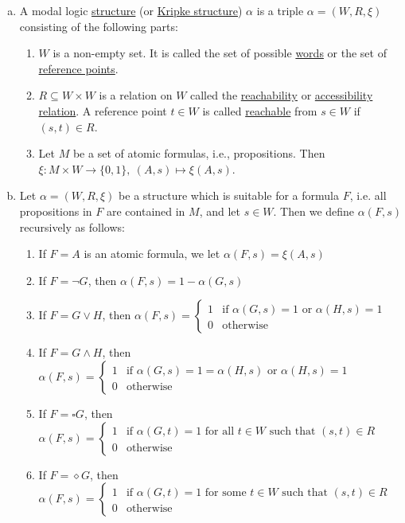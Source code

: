 \documentclass[a4paper]{article}
\newcommand{\ul}{\underline}
\begin{document}
\begin{enumerate}[(a)]
	\item A modal logic \ul{structure} (or \ul{Kripke structure}) $\alpha$ is a triple $\alpha=(W,R,\xi)$ consisting of the following parts:
	\begin{enumerate}[(1)]
		\item $W$ is a non-empty set. It is called the set of possible \ul{words} or the set of \ul{reference points}.
		\item $R\subseteq W\times W$ is a relation on $W$ called the \ul{reachability} or \ul{accessibility relation}. A reference point $t\in W$ is called \ul{reachable} from $s\in W$ if $(s,t)\in R$.
		\item Let $M$ be a set of atomic formulas, i.e., propositions. Then $\xi:M\times W\rightarrow\{0,1\},\ (A,s)\mapsto\xi(A,s)$.
	\end{enumerate}
	\item Let $\alpha=(W,R,\xi)$ be a structure which is suitable for a formula $F$, i.e. all propositions in $F$ are contained in $M$, and let $s\in W$. Then we define $\alpha(F,s)$ recursively as follows:
	\begin{enumerate}[(1)]
		\item If $F=A$ is an atomic formula, we let $\alpha(F,s)=\xi(A,s)$
		\item If $F=\neg G$, then $\alpha(F,s)=1-\alpha(G,s)$
		\item If $F=G\vee H$, then $\alpha(F,s)=\begin{cases}
		1&\text{if }\alpha(G,s)=1\text{ or }\alpha(H,s)=1\\
		0&\text{otherwise}
		\end{cases}$
		\item If $F=G\wedge H$, then $\alpha(F,s)=\begin{cases}
		1&\text{if }\alpha(G,s)=1=\alpha(H,s)\text{ or }\alpha(H,s)=1\\
		0&\text{otherwise}
		\end{cases}$
		\item If $F=\square G$, then $\alpha(F,s)=\begin{cases}
		1&\text{if }\alpha(G,t)=1\text{ for all }t\in W\text{ such that }(s,t)\in R\\
		0&\text{otherwise}
		\end{cases}$
		\item If $F=\diamond G$, then $\alpha(F,s)=\begin{cases}
		1&\text{if }\alpha(G,t)=1\text{ for some }t\in W\text{ such that }(s,t)\in R\\
		0&\text{otherwise}
		\end{cases}$
	\end{enumerate}
\end{enumerate}
\end{document}
